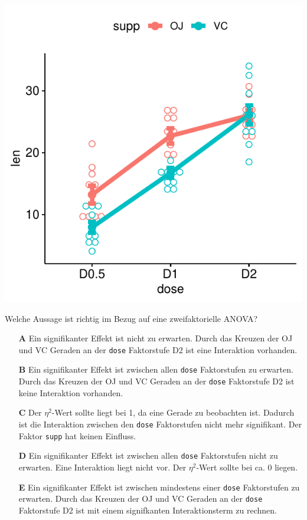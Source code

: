 \documentclass[a4paper, 10pt]{scrartcl}\usepackage[]{graphicx}\usepackage[]{xcolor}
\makeatletter
\def\maxwidth{ %
  \ifdim\Gin@nat@width>\linewidth
    \linewidth
  \else
    \Gin@nat@width
  \fi
}
\makeatother
\begin{document}
{\centering \includegraphics[width=\maxwidth]{img/mc-anova-02-a-1} 

}




Welche Aussage ist richtig im Bezug auf eine zweifaktorielle ANOVA?



\begin{enumerate}
\item [\textbf{A} \msquare] Ein signifikanter Effekt ist nicht zu erwarten. Durch das Kreuzen der OJ und VC Geraden an der \texttt{dose} Faktorstufe D2 ist eine Interaktion vorhanden.
\item [\textbf{B} \msquare] Ein signifikanter Effekt ist zwischen allen \texttt{dose} Faktorstufen zu erwarten. Durch das Kreuzen der OJ und VC Geraden an der \texttt{dose} Faktorstufe D2 ist keine Interaktion vorhanden.
\item [\textbf{C} \msquare] Der $\eta^2$-Wert sollte liegt bei 1, da eine Gerade zu beobachten ist. Dadurch ist die Interaktion zwischen den \texttt{dose} Faktorstufen nicht mehr signifikant. Der Faktor \texttt{supp} hat keinen Einfluss.
\item [\textbf{D} \msquare] Ein signifikanter Effekt ist zwischen allen \texttt{dose} Faktorstufen nicht zu erwarten. Eine Interaktion liegt nicht vor. Der $\eta^2$-Wert sollte bei ca. 0 liegen.
\item [\textbf{E} \msquare] Ein signifikanter Effekt ist zwischen mindestens einer \texttt{dose} Faktorstufen zu erwarten. Durch das Kreuzen der OJ und VC Geraden an der \texttt{dose} Faktorstufe D2 ist mit einem signifkanten Interaktionsterm zu rechnen.
\end{enumerate} 
\end{document}

